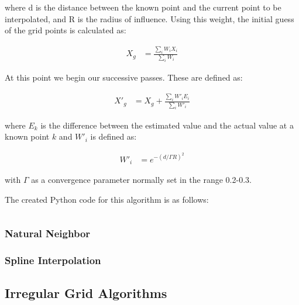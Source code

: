             where d is the distance between the known point and the current point to be interpolated, and R is the radius of influence. Using this weight, the initial guess of the grid points is calculated as: 
            
            \begin{align*}
                X_{g} &= \frac{\sum_{i}{W_{i}X_{i}}}{\sum_{i}{W_{i}}}
            \end{align*}

            At this point we begin our successive passes. These are defined as:

            \begin{align*}
                X'_{g} &= X_{g} + \frac{\sum_{i}{W'_{i}E_{i}}}{\sum_{i}{W'_{i}}}
            \end{align*}

            where $E_{k}$ is the difference between the estimated value and the actual value at a known point $k$ and $W'_{i}$ is defined as:

            \begin{align*}
                W'_{i} &= e^{-(d/\Gamma R)^{2}}
            \end{align*}

            with $\Gamma$ as a convergence parameter normally set in the range 0.2-0.3.

            The created Python code for this algorithm is as follows:

            \inputminted[mathescape,linenos,numbersep=5pt,frame=lines,framesep=2mm]{python}{../Data/OpenSense/barnes.py}

        
        \subsubsection{Natural Neighbor}\label{background_interpolation_methods_naturalneighbour}
        
        \subsubsection{Spline Interpolation}\label{background_interpolation_methods_splineinterpolation}

    \subsection{Irregular Grid Algorithms}\label{background_interpolation_methods_irregular_grid}

